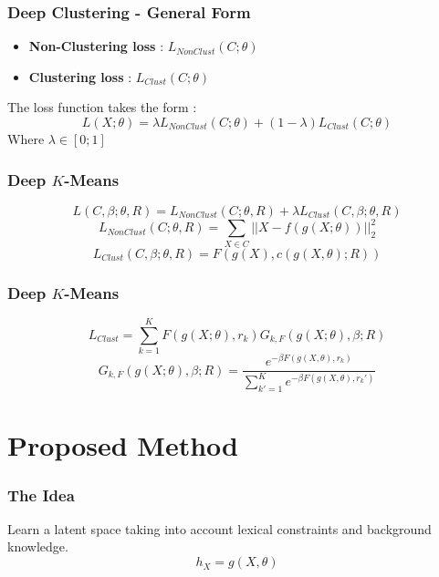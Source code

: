 \documentclass{beamer}
\begin{document}
\begin{frame}
\frametitle{Deep Clustering - General Form}
\begin{itemize}
\item \textbf{Non-Clustering loss} : $L_{NonClust}(C;\theta)$
\item \textbf{Clustering loss} : $L_{Clust}(C;\theta)$
\end{itemize}
\pause
The loss function takes the form :
\begin{equation*}
L(X;\theta) = \lambda L_{NonClust}(C;\theta) + (1-\lambda)L_{Clust}(C; \theta)
\end{equation*}
Where $\lambda \in [0 ; 1]$

\end{frame}
\begin{frame}
  \frametitle{Deep $K$-Means }
\begin{equation*}
L(C ,\beta;\theta,R) = L_{NonClust}(C;\theta,R ) + \lambda L_{Clust}(C,\beta;\theta,R)
\end{equation*}
\begin{equation*}
L_{NonClust}(C;\theta,R ) = \sum_{X \in C} ||X - f(g(X;\theta))||_2^2
\end{equation*}
\begin{equation*}
  L_{Clust}(C,\beta;\theta,R) = F(g(X),c(g(X, \theta); R))
\end{equation*}
\end{frame}

\begin{frame}
  \frametitle{Deep $K$-Means }
\begin{equation*}
L_{Clust} = \sum_{k=1}^K F(g(X; \theta), r_k) G_{k, F}(g(X; \theta), \beta; R)
\end{equation*}
\begin{equation*}
G_{k, F}(g(X; \theta), \beta; R) = \frac{e^{-\beta F(g(X, \theta),r_k)}}
{\sum_{k' = 1}^K e^{-\beta F(g(X, \theta),r_k')}}
\end{equation*}
\end{frame}
\section{Proposed Method}

\begin{frame}
\frametitle{The Idea}
Learn a latent space taking into account lexical constraints and
background knowledge.
\pause
\begin{equation*}\label{eq:h}
  h_X = g(X,\theta)
\end{equation*}
\end{frame}
\end{document}
